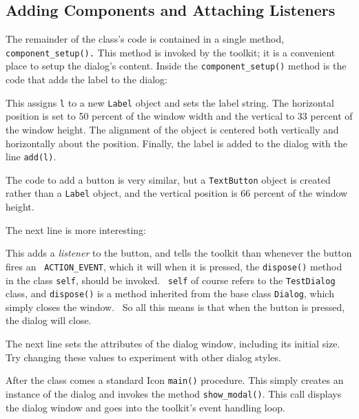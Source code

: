 \subsection*{Adding Components and Attaching Listeners}

The remainder of the class's code is contained in a single method,
\texttt{component\_setup().} This method is invoked by the toolkit; it
is a convenient place to setup the dialog's content.
Inside the \texttt{component\_setup()} method is the code that adds
the label to the dialog:


\noindent This assigns \texttt{l} to a new \texttt{Label} object
and sets the label string. The horizontal position is set to 50 percent of
the window width and the vertical to 33 percent of the window height.
The alignment of the object is centered both vertically and
horizontally about the position. Finally, the label is added to the
dialog with the line \texttt{add(l)}.

The code to add a button is very similar, but a \texttt{TextButton}
object is created rather than a \texttt{Label} object, and the vertical
position is 66 percent of the window height.

The next line is more interesting:


\noindent This adds a \textit{listener} to the button, and tells the toolkit
than whenever the button fires an \ \texttt{ACTION\_EVENT}, which it will
when it is pressed, the \texttt{dispose()} method in the class
\texttt{self}, should be invoked. \ \texttt{self} of course refers to
the \texttt{TestDialog} class, and \texttt{dispose()} is a method
inherited from the base class \texttt{Dialog}, which simply closes the
window. \ So all this means is that when the button is pressed, the
dialog will close.

The next line sets the attributes of the dialog window, including its
initial size. Try changing these values to experiment with other dialog
styles.


After the class comes a standard Icon \texttt{main()} procedure. This
simply creates an instance of the dialog and invokes the method
\texttt{show\_modal()}.
This call displays the dialog window and goes into the
toolkit's event handling loop.

